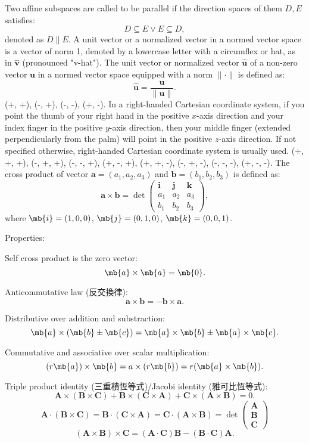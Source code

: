 \documentclass[a4paper,12pt]{article}
\begin{document}
Two affine subspaces are called to be parallel if the direction spaces of them $D,E$ satisfies:
\[D\subseteq E\lor E\subseteq D,\]
denoted as $D\parallel E$.
A unit vector or a normalized vector in a normed vector space is a vector of norm 1, denoted by a lowercase letter with a circumflex or hat, as in $\hat{\mathbf{v}}$ (pronounced "v-hat"). The unit vector or normalized vector $\hat{\mathbf{u}}$ of a non-zero vector $\mathbf{u}$ in a normed vector space equipped with a norm $\|\cdot\|$ is defined as:
\[\hat{\mathbf{u}}=\frac{\mathbf{u}}{\|\mathbf{u}\|}.\]
(+, +), (-, +), (-, -), (+, -).
In a right-handed Cartesian coordinate system, if you point the thumb of your right hand in the positive $x$-axis direction and your index finger in the positive $y$-axis direction, then your middle finger (extended perpendicularly from the palm) will point in the positive $z$-axis direction. If not specified otherwise, right-handed Cartesian coordinate system is usually used.
(+, +, +), (-, +, +), (-, -, +), (+, -, +), (+, +, -), (-, +, -), (-, -, -), (+, -, -).
The cross product of vector $\mathbf{a}=(a_1,a_2,a_3)$ and $\mathbf{b}=(b_1,b_2,b_3)$ is defined as:
\[\mathbf{a}\times\mathbf{b}=\det\begin{pmatrix}\mathbf{i} & \mathbf{j} & \mathbf{k}\\a_1 & a_2 & a_3\\b_1 & b_2 & b_3\end{pmatrix},\]
where $\mb{i}=(1,0,0)$, $\mb{j}=(0,1,0)$, $\mb{k}=(0,0,1)$.

Properties:
\bit
\item Self cross product is the zero vector:
\[\mb{a}\times\mb{a}=\mb{0}.\]
\item Anticommutative law (反交換律):
\[\mathbf{a}\times\mathbf{b}=-\mathbf{b}\times\mathbf{a}.\]
\item Distributive over addition and substraction:
\[\mb{a}\times(\mb{b}\pm\mb{c})=\mb{a}\times\mb{b}\pm\mb{a}\times\mb{c}.\]
\item Commutative and associative over scalar multiplication:
\[(r\mb{a})\times\mb{b}=a\times(r\mb{b})=r(\mb{a}\times\mb{b}).\]
\item Triple product identity (三重積恆等式)/Jacobi identity (雅可比恆等式):
\[\mathbf{A}\times(\mathbf{B}\times\mathbf{C})+\mathbf{B}\times(\mathbf{C}\times\mathbf{A})+\mathbf{C}\times(\mathbf{A}\times\mathbf{B})=0.\]
\[\mathbf{A}\cdot(\mathbf{B}\times\mathbf{C})=\mathbf{B}\cdot(\mathbf{C}\times\mathbf{A})=\mathbf{C}\cdot(\mathbf{A}\times\mathbf{B})=\det\begin{pmatrix}\mathbf{A}\\\mathbf{B}\\\mathbf{C}\end{pmatrix}\]
\[(\mathbf{A}\times\mathbf{B})\times\mathbf{C}=(\mathbf{A}\cdot\mathbf{C})\mathbf{B}-(\mathbf{B}\cdot\mathbf{C})\mathbf{A}.\]
\eit
\end{document}
